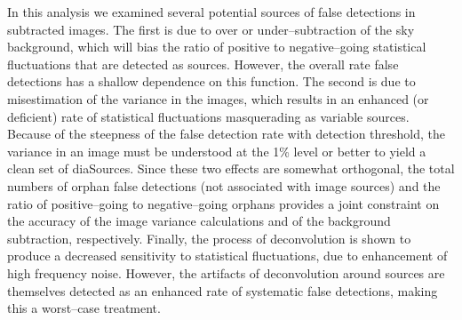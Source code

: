 \documentclass[iop]{emulateapj}
\begin{document}


In this analysis we examined several potential sources of false detections in subtracted images.
The first is due to over or under--subtraction of the sky background, which will bias the ratio of positive to negative--going statistical fluctuations that are detected as sources.
However, the overall rate false detections has a shallow dependence on this function.
The second is due to misestimation of the variance in the images, which results in an enhanced (or deficient) rate of statistical fluctuations masquerading as variable sources.
Because of the steepness of the false detection rate with detection threshold, the variance in an image must be understood at the 1\% level or better to yield a clean set of diaSources.
Since these two effects are somewhat orthogonal, the total numbers of orphan false detections (not associated with image sources) and the ratio of positive--going to negative--going orphans provides a joint constraint on the accuracy of the image variance calculations and of the background subtraction, respectively.
Finally, the process of deconvolution is shown to produce a decreased sensitivity to statistical fluctuations, due to enhancement of high frequency noise.
However, the artifacts of deconvolution around sources are themselves detected as an enhanced rate of systematic false detections, making this a worst--case treatment.
\end{document}

